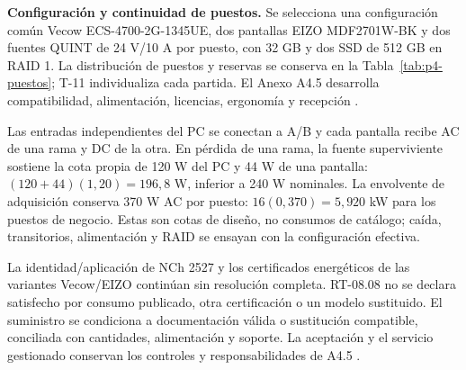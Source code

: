 \textbf{Configuración y continuidad de puestos.}
Se selecciona una configuración común Vecow ECS-4700-2G-1345UE, dos pantallas EIZO MDF2701W-BK y dos fuentes QUINT de 24 V/10 A por puesto, con 32 GB y dos SSD de 512 GB en RAID 1. La distribución de puestos y reservas se conserva en la Tabla~\ref{tab:p4-puestos}; T-11 individualiza cada partida. El Anexo A4.5 desarrolla compatibilidad, alimentación, licencias, ergonomía y recepción \parencites{p9-vecow-datasheet-2025,p6-puestos-eizo,p6-puestos-quint}.

Las entradas independientes del PC se conectan a A/B y cada pantalla recibe AC de una rama y DC de la otra. En pérdida de una rama, la fuente superviviente sostiene la cota propia de 120 W del PC y 44 W de una pantalla: $(120+44)(1,20)=196,8$ W, inferior a 240 W nominales. La envolvente de adquisición conserva 370 W AC por puesto: $16(0,370)=5,920$ kW para los puestos de negocio. Estas son cotas de diseño, no consumos de catálogo; caída, transitorios, alimentación y RAID se ensayan con la configuración efectiva.

La identidad/aplicación de NCh 2527 y los certificados energéticos de las variantes Vecow/EIZO continúan sin resolución completa. RT-08.08 no se declara satisfecho por consumo publicado, otra certificación o un modelo sustituido. El suministro se condiciona a documentación válida o sustitución compatible, conciliada con cantidades, alimentación y soporte. La aceptación y el servicio gestionado conservan los controles y responsabilidades de A4.5 \parencite[RT-08.08, p.~19]{pucv-transversal}.
